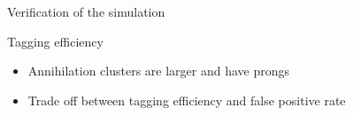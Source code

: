 \documentclass{beamer}
\begin{document}
\begin{frame}{\centering Verification of the simulation}
{    }
\end{frame}



\begin{frame}{\centering Tagging efficiency}
  \begin{itemize}
  \item<1->{Annihilation clusters are larger and have prongs}
  \item<2->{Trade off between tagging efficiency and false positive rate}
  \end{itemize}
\end{frame}
\end{document}
